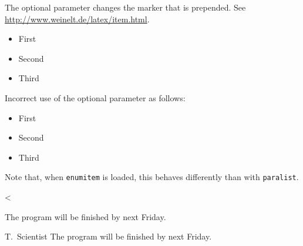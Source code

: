 The optional parameter changes the marker that is prepended.
See \url{http://www.weinelt.de/latex/item.html}.
\begin{itemize}
  \item[A] First
  \item[B] Second
  \item[C] Third
\end{itemize}

Incorrect use of the optional parameter as follows:
\begin{itemize}
  \item[first] First
  \item[second] Second
  \item[third] Third
\end{itemize}
Note that, when \texttt{enumitem} is loaded, this behaves differently than with \texttt{paralist}.

<%

\begin{fquote}[T.\ Scientist]
  The program will be finished by next Friday.
\end{fquote}

\begin{gfquote}{T.\ Scientist}
  The program will be finished by next Friday.
\end{gfquote}

